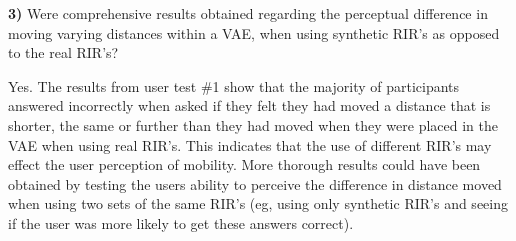 \documentclass[../../main.tex]{subfiles}
\begin{document}



			\textbf{3)} Were comprehensive results obtained regarding the perceptual difference in moving varying distances within a \ac{VAE}, when using synthetic \ac{RIR}'s as opposed to the real \ac{RIR}'s?

				Yes. The results from user test \#1 show that the majority of participants answered incorrectly when asked if they felt they had moved a distance that is shorter, the same or further than they had moved when they were placed in the \ac{VAE} when using real \ac{RIR}'s. This indicates that the use of different \ac{RIR}'s may effect the user perception of mobility. More thorough results could have been obtained by testing the users ability to perceive the difference in distance moved when using two sets of the same \ac{RIR}'s (eg, using only synthetic \ac{RIR}'s and seeing if the user was more likely to get these answers correct).


\end{document}
